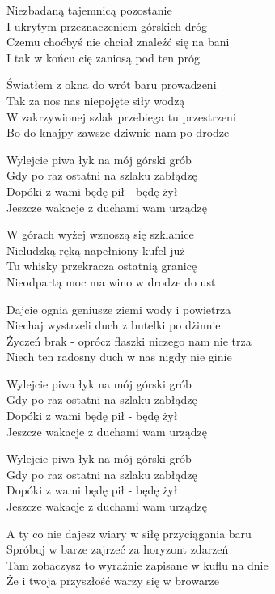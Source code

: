 \begin{text}
Niezbadaną tajemnicą pozostanie\\
I ukrytym przeznaczeniem górskich dróg\\
Czemu choćbyś nie chciał znaleźć się na bani\\
I tak w końcu cię zaniosą pod ten próg

Światłem z okna do wrót baru prowadzeni\\
Tak za nos nas niepojęte siły wodzą\\
W zakrzywionej szlak przebiega tu przestrzeni\\
Bo do knajpy zawsze dziwnie nam po drodze

\vin Wylejcie piwa łyk na mój górski grób\\
\vin Gdy po raz ostatni na szlaku zabłądzę\\
\vin Dopóki z wami będę pił - będę żył\\
\vin Jeszcze wakacje z duchami wam urządzę

W górach wyżej wznoszą się szklanice\\
Nieludzką ręką napełniony kufel już\\
Tu whisky przekracza ostatnią granicę\\
Nieodpartą moc ma wino w drodze do ust

Dajcie ognia geniusze ziemi wody i powietrza\\
Niechaj wystrzeli duch z butelki po dżinnie\\
Życzeń brak - oprócz flaszki niczego nam nie trza\\
Niech ten radosny duch w nas nigdy nie ginie

Wylejcie piwa łyk na mój górski grób\\
Gdy po raz ostatni na szlaku zabłądzę\\
Dopóki z wami będę pił - będę żył\\
Jeszcze wakacje z duchami wam urządzę

Wylejcie piwa łyk na mój górski grób\\
Gdy po raz ostatni na szlaku zabłądzę\\
Dopóki z wami będę pił - będę żył\\
Jeszcze wakacje z duchami wam urządzę

A ty co nie dajesz wiary w siłę przyciągania baru\\
Spróbuj w barze zajrzeć za horyzont zdarzeń\\
Tam zobaczysz to wyraźnie zapisane w kuflu na dnie\\
Że i twoja przyszłość warzy się w browarze
\end{text}
